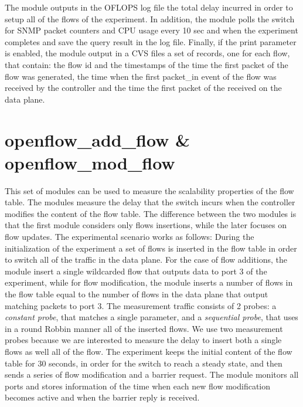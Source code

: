 \documentclass{book}
\begin{document}
The module outputs in the OFLOPS log file the total delay incurred in order to
setup all of the flows of the experiment. In addition, the module polls the 
switch for SNMP packet counters and CPU usage every 10 sec and when the experiment 
completes and save the query result in the log file. Finally, if the print 
parameter is enabled, the module output in a CVS files a set of 
records,  one for each flow, that contain: the flow id and the timestamps of the time the first
packet of the flow was generated, the time when the first packet\_in event of
the flow was received by the controller and the time the first packet of the
received on the data plane. 

\section{openflow\_add\_flow  \& openflow\_mod\_flow}

This set of modules can be used to measure the scalability properties of the flow
table. The modules measure the delay that the switch incurs when the controller
modifies the content of the flow table. The difference between the two modules is that the first
module considers only flows insertions, while the later focuses on flow updates.
The experimental scenario works as follows: During the initialization of the
experiment a set of flows is inserted in the flow table in order to switch all
of the traffic in the data plane. For the case of flow additions, the module
insert a single wildcarded flow that outputs data to port 3 of the 
experiment, while for flow modification, the module inserts a number of flows in the flow
table equal to the number of flows in the data plane that output matching
packets to port 3. The measurement traffic consists of 2 probes: a \emph{constant probe}, that
matches a single parameter, and a \emph{sequential probe}, that uses in a round
Robbin manner all of the inserted flows. We use two measurement probes
because we are interested to measure the delay to insert both a single flows as
well all of the flow. The experiment keeps the initial content of the flow table 
for 30 seconds, in order for the switch to reach a
steady state, and then sends a series of flow modification and a barrier
request. The module monitors all ports and stores information of the time 
when each new flow modification becomes active and when the barrier reply is
received. 
\end{document}
